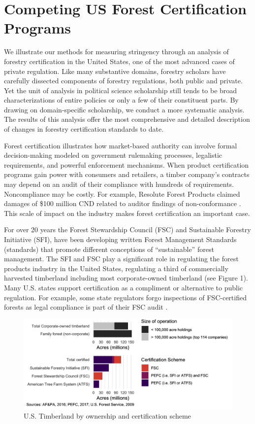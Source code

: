 \documentclass[
      12pt,
            Review ]{article}
\begin{document}
\section{Competing US Forest Certification
Programs}\label{competing-us-forest-certification-programs}

We illustrate our methods for measuring stringency through an analysis
of forestry certification in the United States, one of the most advanced
cases of private regulation. Like many substantive domains, forestry
scholars have carefully dissected components of forestry regulations,
both public and private. Yet the unit of analysis in political science
scholarship still tends to be broad characterizations of entire policies
or only a few of their constituent parts. By drawing on domain-specific
scholarship, we conduct a more systematic analysis. The results of this
analysis offer the most comprehensive and detailed description of
changes in forestry certification standards to date.

Forest certification illustrates how market-based authority can involve
formal decision-making modeled on government rulemaking processes,
legalistic requirements, and powerful enforcement mechanisms. When
product certification programs gain power with consumers and retailers,
a timber company's contracts may depend on an audit of their compliance
with hundreds of requirements. Noncompliance may be costly. For example,
Resolute Forest Products claimed damages of \$100 million CND related to
auditor findings of non-conformance \citep{Tigar2017}. This scale of
impact on the industry makes forest certification an important case.

For over 20 years the Forest Stewardship Council (FSC) and Sustainable
Forestry Initiative (SFI), have been developing written Forest
Management Standards (standards) that promote different conceptions of
``sustainable'' forest management. The SFI and FSC play a significant
role in regulating the forest products industry in the United States,
regulating a third of commercially harvested timberland including most
corporate-owned timberland (see Figure 1). Many U.S. states support
certification as a compliment or alternative to public regulation. For
example, some state regulators forgo inspections of FSC-certified
forests as legal compliance is part of their FSC audit
\citep{Judge-Lord2013}.

\begin{figure}
\centering
\includegraphics{acres-1.png}
\caption{U.S. Timberland by ownership and certification scheme}
\end{figure}
\end{document}
